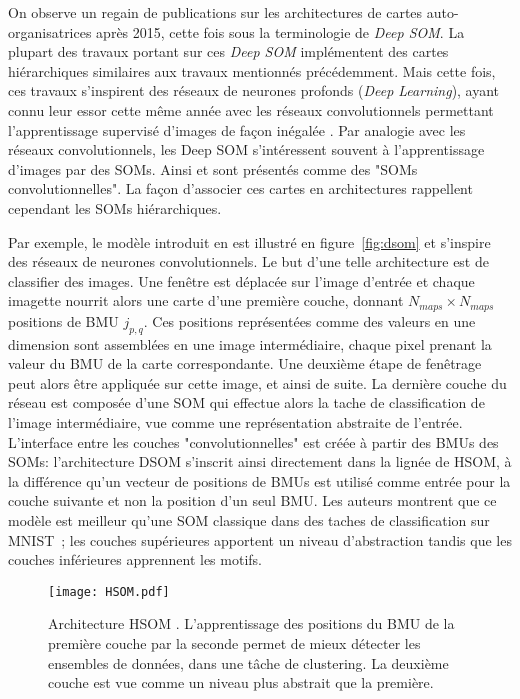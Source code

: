\documentclass[../main]{subfiles}
\begin{document}
On observe un regain de publications sur les architectures de cartes auto-organisatrices après 2015, cette fois sous la terminologie de \emph{Deep SOM}.
La plupart des travaux portant sur ces \emph{Deep SOM} implémentent des cartes hiérarchiques similaires aux travaux mentionnés précédemment. 
Mais cette fois, ces travaux s'inspirent des réseaux de neurones profonds (\emph{Deep Learning}), ayant connu leur essor cette même année avec les réseaux convolutionnels permettant l'apprentissage supervisé d'images de façon inégalée \cite{lecun_deep_2015}.
Par analogie avec les réseaux convolutionnels, les Deep SOM s'intéressent souvent à l'apprentissage d'images par des SOMs. Ainsi \cite{Liu2015DeepSM,hankins_somnet_2018,wickramasinghe_deep_2019,aly_deep_2020,sakkari_convolutional_2020,dozono_convolutional_2016,nawaratne_hierarchical_2020-1,mici_self-organizing_2018} et sont présentés comme des "SOMs convolutionnelles". La façon d'associer ces cartes en architectures rappellent cependant les SOMs hiérarchiques.

Par exemple, le modèle introduit en \cite{Liu2015DeepSM} est illustré en figure~\ref{fig:dsom} et s'inspire des réseaux de neurones convolutionnels.
Le but d'une telle architecture est de classifier des images. Une fenêtre est déplacée sur l'image d'entrée et chaque imagette nourrit alors une carte d'une première couche, donnant $N_{maps}  \times N_{maps}$ positions de BMU $j_{p,q}$. Ces positions représentées comme des valeurs en une dimension sont assemblées en une image intermédiaire, chaque pixel prenant la valeur du BMU de la carte correspondante. Une deuxième étape de fenêtrage peut alors être appliquée sur cette image, et ainsi de suite. La dernière couche du réseau est composée d'une SOM qui effectue alors la tache de classification de l'image intermédiaire, vue comme une représentation abstraite  de l'entrée.
L'interface entre les couches "convolutionnelles" est créée à partir des BMUs des SOMs: l'architecture DSOM s'inscrit ainsi directement dans la lignée de HSOM, à la différence qu'un vecteur de positions de BMUs est utilisé comme entrée pour la couche suivante et non la position d'un seul BMU.
Les auteurs montrent que ce modèle est meilleur qu'une SOM classique dans des taches de classification sur MNIST~; les couches supérieures apportent un niveau d'abstraction tandis que les couches inférieures apprennent les motifs.

\begin{figure}
    \centering
    \texttt{[image: HSOM.pdf]}
    \caption{Architecture HSOM \cite{lampinen_clustering_1992}. L'apprentissage des positions du BMU de la première couche par la seconde permet de mieux détecter les ensembles de données, dans une tâche de clustering. La deuxième couche est vue comme un niveau plus abstrait que la première. \label{fig:hsom}}
\end{figure}
\end{document}
